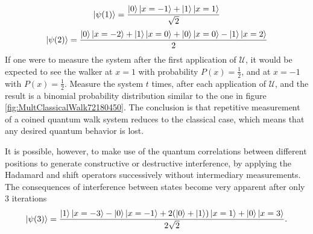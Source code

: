 \documentclass[../../dissertation.tex]{subfiles}
\begin{document}
\begin{equation}
	\ket{\psi(1)} = \frac{\ket{0}\ket{x=-1}+\ket{1}\ket{x=1}}{\sqrt{2}}
\end{equation}
\begin{equation}
	\ket{\psi(2)} = \frac{\ket{0}\ket{x=-2}+\ket{1}\ket{x=0}+\ket{0}\ket{x=0}-\ket{1}\ket{x=2}}{2}
\end{equation}
If one were to measure the system after the first application of $\mathcal{U}$,
it would be expected to see the walker at $x=1$ with probability $P(x) =
\frac{1}{2}$, and at $x=-1$ with $P(x) = \frac{1}{2}$. Measure the
system $t$ times, after each application of $\mathcal{U}$, and the result is a
binomial probability distribution similar to the one in figure
\ref{fig:MultClassicalWalk72180450}. The conclusion is that repetitive
measurement of a coined quantum walk system reduces to the classical case,
which means that any desired quantum behavior is lost. \par

It is possible, however, to make use of the quantum correlations between
different positions to generate constructive or destructive interference, by
applying the Hadamard and shift operators successively without intermediary
measurements.  The consequences of interference between states become very
apparent after only 3 iterations 
\begin{equation}
	\ket{\psi(3)} = \frac{\ket{1}\ket{x=-3}-\ket{0}\ket{x=-1}+2(\ket{0}+\ket{1})\ket{x=1}+\ket{0}\ket{x=3}}{2\sqrt{2}}\label{eq:coinedSimulThirdStep}.
\end{equation}
\end{document}
